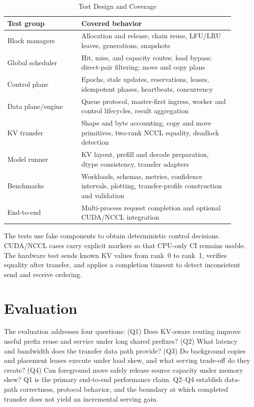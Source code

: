 \documentclass{article}
\begin{document}
\begin{table}[t]
  \centering
  \caption{Test Design and Coverage}
  \label{tab:tests}
  \footnotesize
  \setlength{\tabcolsep}{3.5pt}
  \begin{tabular}{@{}p{0.30\linewidth}p{0.62\linewidth}@{}}
    \toprule
    Test group & Covered behavior \\
    \midrule
    Block managers & Allocation and release, chain reuse, LFU/LRU leaves, generations, snapshots \\
    Global scheduler & Hit, miss, and capacity routes; load bypass; direct-pair filtering; move and copy plans \\
    Control plane & Epochs, stale updates, reservations, leases, idempotent phases, heartbeats, concurrency \\
    Data plane/engine & Queue protocol, master-first ingress, worker and control lifecycles, result aggregation \\
    KV transfer & Shape and byte accounting, copy and move primitives, two-rank NCCL equality, deadlock detection \\
    Model runner & KV layout, prefill and decode preparation, dtype consistency, transfer adapters \\
    Benchmarks & Workloads, schemas, metrics, confidence intervals, plotting, transfer-profile construction and validation \\
    End-to-end & Multi-process request completion and optional CUDA/NCCL integration \\
    \bottomrule
  \end{tabular}
\end{table}

The tests use fake components to obtain deterministic control decisions. CUDA/NCCL cases carry explicit markers so that CPU-only CI remains usable. The hardware test sends known KV values from rank~0 to rank~1, verifies equality after transfer, and applies a completion timeout to detect inconsistent send and receive ordering.

\section{Evaluation}
\label{sec:eval}

The evaluation addresses four questions: (Q1) Does KV-aware routing improve useful prefix reuse and service under long shared prefixes? (Q2) What latency and bandwidth does the transfer data path provide? (Q3) Do background copies and placement leases execute under load skew, and what serving trade-off do they create? (Q4) Can foreground move safely release source capacity under memory skew? Q1 is the primary end-to-end performance claim. Q2--Q4 establish data-path correctness, protocol behavior, and the boundary at which completed transfer does not yield an incremental serving gain.
\end{document}

